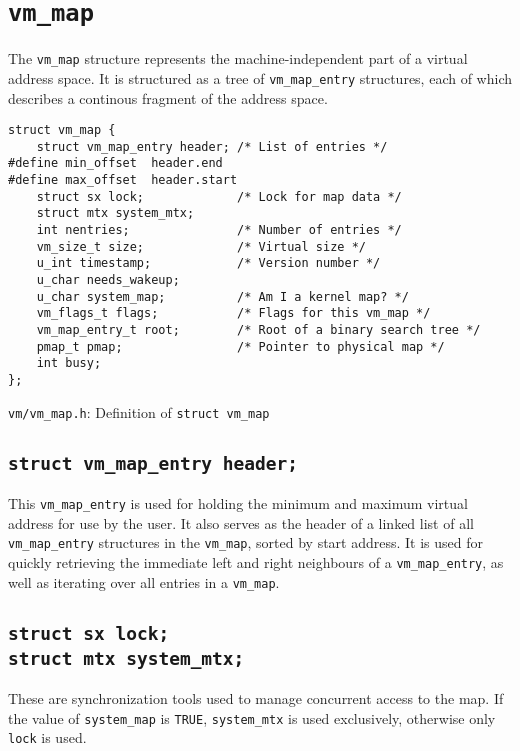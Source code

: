 \documentclass[shortabstract, english]{iithesis}
\begin{document}
\section{\texttt{vm_map}}

The \texttt{vm_map} structure represents the machine-independent part of a
virtual address space. It is structured as a tree of \texttt{vm_map_entry}
structures, each of which describes a continous fragment of the address space.


\begin{listing}[H]
\begin{verbatim}
struct vm_map {
    struct vm_map_entry header; /* List of entries */
#define min_offset  header.end
#define max_offset  header.start
    struct sx lock;             /* Lock for map data */
    struct mtx system_mtx;
    int nentries;               /* Number of entries */
    vm_size_t size;             /* Virtual size */
    u_int timestamp;            /* Version number */
    u_char needs_wakeup;
    u_char system_map;          /* Am I a kernel map? */
    vm_flags_t flags;           /* Flags for this vm_map */
    vm_map_entry_t root;        /* Root of a binary search tree */
    pmap_t pmap;                /* Pointer to physical map */
    int busy;
};
\end{verbatim}
\caption{\texttt{vm/vm\_map.h}: Definition of \texttt{struct vm_map}}
\end{listing}

\subsection*{\texttt{struct vm_map_entry header;}}
This \texttt{vm_map_entry} is used for holding the minimum and maximum virtual
address for use by the user. It also serves as the header of a linked list of
all \texttt{vm_map_entry} structures in the \texttt{vm_map}, sorted by start
address. It is used for quickly retrieving the immediate left and right
neighbours of a \texttt{vm_map_entry}, as well as iterating over all entries
in a \texttt{vm_map}.

\subsection*{\texttt{struct sx lock;}\\
  \texttt{struct mtx system_mtx;}}
These are synchronization tools used to manage concurrent access to the map. If
the value of \texttt{system_map} is \texttt{TRUE}, \texttt{system_mtx} is used
exclusively, otherwise only \texttt{lock} is used.
\end{document}
